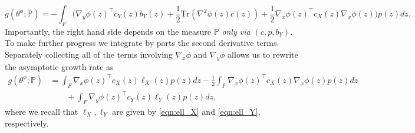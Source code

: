 \documentclass{article}
\theoremstyle{plain}
\theoremstyle{definition}
\renewcommand{\P}{\mathbb{P}}
\numberwithin{lem}{section}
\begin{document}
\[g(\theta^\phi;\P) = -\int_F\big(\nabla_y \phi(z)^\top c_Y(z) b_Y(z) + \frac{1}{2}\mathrm{Tr}(\nabla^2 \phi (z)c(z)) + \frac{1}{2}\nabla_x \phi(z)^\top c_X(z)\nabla_x \phi(z)\big)p(z)dz. \]
Importantly, the right hand side depends on the measure $\P$ \emph{only via $(c,p,b_Y)$}. To make further progress we integrate by parts the second derivative terms. Separately collecting all of the terms involving $\nabla_x \phi$ and $\nabla_y \phi$ allows us to rewrite the asymptotic growth rate as 
\begin{equation}
\begin{aligned}
    g(\theta^\phi;\P) & = \int_F \nabla_x \phi(z)^\top c_X(z) \ell_X(z)p(z)dz - \frac{1}{2}\int_F \nabla_x \phi(z)^\top c_X(z)\nabla_x \phi(z)p(z)dz  \\
    & \qquad + \int_F \nabla_y \phi(z)^\top c_Y(z)\ell_Y(z)p(z)dz, \label{eqn:growth_rate_IBP} 
\end{aligned}
\end{equation}
where we recall that $\ell_X,\ell_Y$ are given by \eqref{eqn:ell_X} and \eqref{eqn:ell_Y}, respectively.
\end{document}
